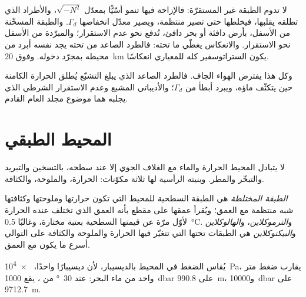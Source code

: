 لا تدوم الطبقة غير المستقرّة: فالإزاحة فيها تنمو أسّيًّا بمعدّل $\sqrt{-N^2}$، والأطراد الذي تطلقه يقلبها، فيخلطها حتى تصير  منتظمة، ويصير معدّل انخفاضها $\Gamma_d$. والطبقة المسخّنة من الأسفل، بأرض دافئة أو بحر دافئ، تُدفع نحو عدم الاستقرار؛ والمبرّدة من الأسفل نحو الاستقرار. والانعكاس يغطّي ما تحته: فالطرد الصاعد من تحته يجد نفسه أبرد من محيطه بمجرّد دخوله. وفوق \qty{20}{km} يكون الستراتوسفير كله للمعياري انعكاسًا.

وكل هذا يفترض الهواء الجاف. فالطرد الصاعد الذي يبلغ التشبّع يُطلق الحرارة الكامنة حين يتكثّف ماؤه، ويبرد أبطأ من $\Gamma_d$؛ والأديباتي المشبع وعدم الاستقرار الشرطي الذي يجلبه هما موضوع مجلد العام القادم.

\section{المحيط الطبقي}\label{sec:b1:fluid-envelopes-structure:ocean}

لا يتبادل المحيط الحرارة والماء مع الغلاف الجوي إلا عند سطحه، بالتسخين والتبريد والتبخّر والمطر. وبنيته الرأسية لها ثلاثة مكوّنات: الحرارة، والملوحة، والكثافة.

\begin{definition}\label{def:b1:fluid-envelopes-structure:ocean-layers}
\emph{الطبقة المختلطة} هي الطبقة السطحية للمحيط التي تكون حرارتها وملوحتها وكثافتها شبه منتظمة مع العمق؛ ويُقرأ عمقها على مقطع بأنه العمق الذي تختلف عنده الحرارة لأوّل مرّة عن قيمتها السطحية بعتبة مختارة، وغالبًا \qty{0.5}{\celsius}. و\emph{الترموكلاين}، و\emph{الهالوكلاين} و\emph{البيكنوكلاين} هي الطبقات تحتها التي تتغيّر فيها الحرارة والملوحة والكثافة على التوالي أسرع ما يكون مع العمق.
\end{definition}

يُقاس الضغط في المحيط بالديسيبار، لأن ديسيبارًا واحدًا، \qty{e4}{Pa}، يقارب ضغط متر واحد من ماء البحر: عند \qty{30}{\degree} من ، يقع \qty{1000}{dbar} على \qty{990.8}{m}، و\qty{10000}{dbar} على \qty{9712.7}{m}.

